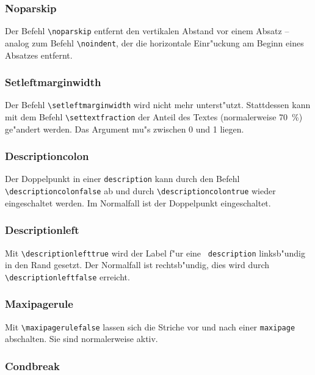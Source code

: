 \subsubsection{Noparskip}

Der Befehl \verb|\noparskip| entfernt den vertikalen Abstand vor einem 
Absatz -- analog zum Befehl \verb|\noindent|, der die horizontale 
Einr"uckung am Beginn eines Absatzes entfernt.

\subsubsection{Setleftmarginwidth}

Der Befehl \verb|\setleftmarginwidth| wird nicht mehr unterst"utzt.
Stattdessen kann mit dem Befehl \verb|\settextfraction| der 
Anteil des Textes (normalerweise 70~\%) ge"andert werden. Das 
Argument mu"s zwischen 0 und 1 liegen.

\subsubsection{Descriptioncolon}

Der Doppelpunkt in einer {\tt description} kann durch den Befehl 
\verb|\descriptioncolonfalse| ab und durch \verb|\descriptioncolontrue| 
wieder eingeschaltet werden. Im Normalfall ist der Doppelpunkt 
eingeschaltet.

\subsubsection{Descriptionleft}

Mit \verb|\descriptionlefttrue| wird der Label f"ur eine {\tt 
description} linksb"undig in den Rand gesetzt. Der Normalfall ist 
rechtsb"undig, dies wird durch \verb|\descriptionleftfalse| erreicht.

\subsubsection{Maxipagerule}

Mit \verb|\maxipagerulefalse| lassen sich die Striche vor und nach 
einer {\tt maxipage} abschalten. Sie sind normalerweise aktiv.

\subsubsection{Condbreak}

